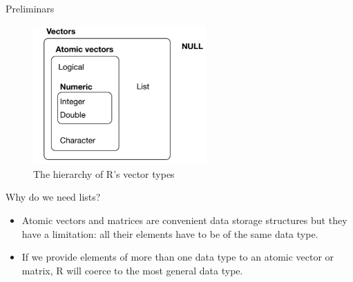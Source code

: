 \documentclass[ignorenonframetext,]{beamer}
\begin{document}
\begin{frame}{Preliminars}
\protect\hypertarget{preliminars-1}{}

\begin{figure}
\centering
\includegraphics[width=2.60417in,height=\textheight]{vec}
\caption{The hierarchy of R's vector types}
\end{figure}

\end{frame}

\begin{frame}{Why do we need lists?}
\protect\hypertarget{why-do-we-need-lists}{}

\begin{itemize}
\item
  Atomic vectors and matrices are convenient data storage structures but
  they have a limitation: all their elements have to be of the same data
  type.
\item
  If we provide elements of more than one data type to an atomic vector
  or matrix, R will coerce to the most general data type.
\end{itemize}

\end{frame}
\end{document}
